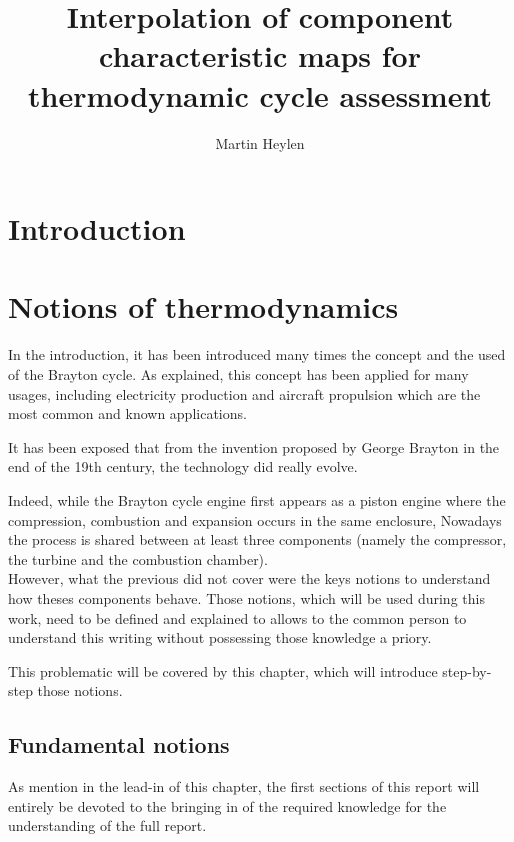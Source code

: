 \documentclass[12pt,a4paper]{report}
\title{Interpolation of component characteristic maps for thermodynamic cycle assessment}
\author{Martin Heylen}
\begin{document}
\maketitle

\tableofcontents

%
\chapter{Introduction}

\newpage
\chapter{Notions of thermodynamics}
\quad\; In the introduction, it has been introduced many times the concept and the used of the Brayton cycle. As explained, this concept has been applied for many usages, including electricity production and aircraft propulsion which are the most common and known applications.

It has been exposed that from the invention proposed by George Brayton in the end of the 19th century, the technology did really evolve.

Indeed, while the Brayton cycle engine first appears as a  piston engine where the compression, combustion and expansion occurs in the same enclosure, Nowadays 
the process is shared between at least three components (namely the compressor, the turbine and the combustion chamber).\\

However, what the previous did not cover were the keys notions to understand how theses components behave. Those notions, which will be used during this work, need to be defined and explained to allows to the common person to understand this writing without possessing those knowledge a priory. 

This problematic will be covered by this chapter, which will introduce step-by-step those notions.

\section{Fundamental notions}
\quad\; As mention in the lead-in of this chapter, the first sections of this report will entirely be devoted to the bringing in of the required knowledge for the understanding of the full report.
\end{document}
